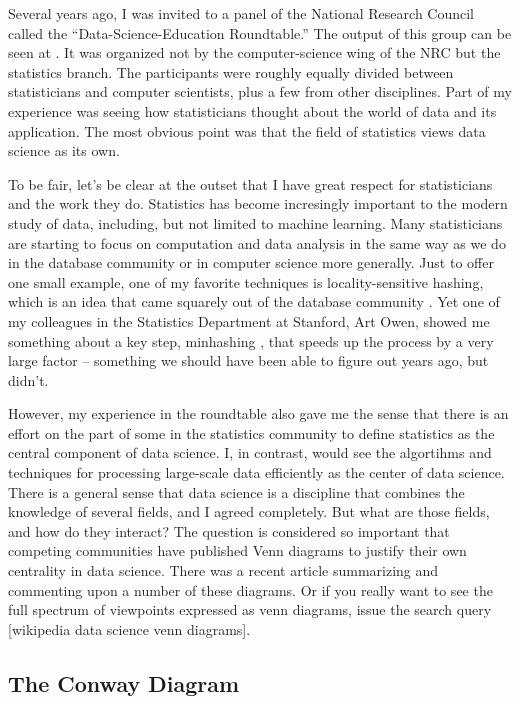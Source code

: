 \documentclass[11pt]{article}
\begin{document}
Several years ago, I was invited to a panel of the National Research Council called the ``Data-Science-Education Roundtable.''  The output of this group can be seen at \cite{dsr}.  It was organized not by the computer-science wing of the NRC but the statistics branch.  The participants were roughly equally divided between  statisticians and computer scientists, plus a few from other disciplines.  Part of my experience was seeing how statisticians thought about the world of data and its application.  The most obvious point was that the field of statistics views data science as its own.

To be fair, let's be clear at the outset that I have great respect for statisticians and the work they do.
Statistics has become incresingly important to the modern study of data, including, but not limited to machine learning.
Many statisticians are starting to focus on computation and data analysis in the same way as we do in the database community or in
computer science more generally.  Just to offer one small example, one of my favorite techniques is locality-sensitive hashing, which is an
idea that came squarely out of the database community \cite{lsh}.   Yet one of my colleagues in the Statistics Department at Stanford, Art Owen,
showed me something \cite{owen} about a key step, minhashing \cite{minhash}, that speeds up the process by a very large factor -- something we should have been able to figure out years ago, but didn't.

However, my experience in the roundtable also gave me the sense that there is an effort on the part of some in the statistics community to define statistics as the central component of data science.  I, in contrast, would see the algortihms and techniques for processing large-scale data efficiently as the center of data science.  There is a general sense that data science is a discipline that combines the knowledge of several fields, and I agreed completely.  But what are those fields, and how do they interact?  The question is considered so important that competing communities have published Venn diagrams to justify their own centrality in data science.  There was a recent article \cite{venn} summarizing and commenting upon  a number of these diagrams.  Or if you really want to see the full spectrum of viewpoints expressed as venn diagrams, issue the search query [wikipedia data science venn diagrams].

\subsection{The Conway Diagram}
\end{document}
